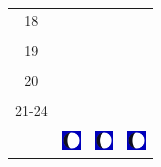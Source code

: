 \documentclass[twoside, a4paper,12pt, tikz]{scrartcl}
\begin{document}
\begin{tabularx}{\linewidth}{|c|X|X|X|}
        &   &       &    \\
      \hline
      18&   &       &    \\
        &   &       &    \\
      \hline
      19&   &       &    \\
        &   &       &    \\
      \hline
      20&   &       &    \\
        &   &       &    \\
      \hline
      21-24&   &       &    \\
        &   &       &    \\
      \hline  
      & \vspace{0.01cm} \centerline{\includegraphics[width=0.5cm]{moon_phases/Moon_phase_3.svg.png}} \vspace{0.1cm} & \vspace{0.01cm} \centerline{\includegraphics[width=0.5cm]{moon_phases/Moon_phase_3.svg.png}} \vspace{0.1cm} & \vspace{0.01cm} \centerline{\includegraphics[width=0.5cm]{moon_phases/Moon_phase_3.svg.png}} \vspace{0.1cm}\\
      \hline   
    \end{tabularx}




    \newpage

        \noindent
\end{document}
